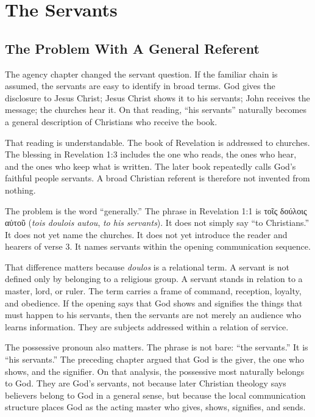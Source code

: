 \chapter{The Servants}

\section{The Problem With A General Referent}

The agency chapter changed the servant question. If the familiar chain is assumed, the servants are easy to identify in broad terms. God gives the disclosure to Jesus Christ; Jesus Christ shows it to his servants; John receives the message; the churches hear it. On that reading, ``his servants'' naturally becomes a general description of Christians who receive the book.

That reading is understandable. The book of Revelation is addressed to churches. The blessing in Revelation 1:3 includes the one who reads, the ones who hear, and the ones who keep what is written. The later book repeatedly calls God's faithful people servants. A broad Christian referent is therefore not invented from nothing.

The problem is the word ``generally.'' The phrase in Revelation 1:1 is \textgreek{τοῖς δούλοις αὐτοῦ} (\textit{tois doulois autou}, \textit{to his servants}). It does not simply say ``to Christians.'' It does not yet name the churches. It does not yet introduce the reader and hearers of verse 3. It names servants within the opening communication sequence.

That difference matters because \textit{doulos} is a relational term. A servant is not defined only by belonging to a religious group. A servant stands in relation to a master, lord, or ruler. The term carries a frame of command, reception, loyalty, and obedience. If the opening says that God shows and signifies the things that must happen to his servants, then the servants are not merely an audience who learns information. They are subjects addressed within a relation of service.

The possessive pronoun also matters. The phrase is not bare: ``the servants.'' It is ``his servants.'' The preceding chapter argued that God is the giver, the one who shows, and the signifier. On that analysis, the possessive most naturally belongs to God. They are God's servants, not because later Christian theology says believers belong to God in a general sense, but because the local communication structure places God as the acting master who gives, shows, signifies, and sends.

